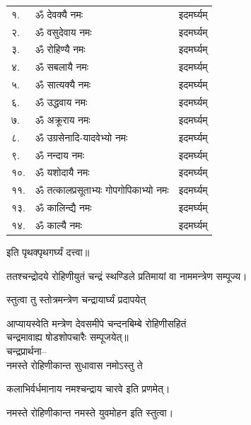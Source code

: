 \begin{center}
\begin{longtable}{ll@{—}l}
१.& ॐ देवक्यै नमः & इदमर्घ्यम्\\
२.& ॐ वसुदेवाय नमः & इदमर्घ्यम्\\
३.& ॐ रोहिण्यै नमः & इदमर्घ्यम्	\\
४.& ॐ सबलायै नमः & इदमर्घ्यम्	\\
५.& ॐ सात्यक्यै नमः & इदमर्घ्यम्\\
६.& ॐ उद्धवाय नमः & इदमर्घ्यम्	\\
७.& ॐ अक्रूराय नमः & इदमर्घ्यम्\\
८.& ॐ उग्रसेनादि-यादवेभ्यो नमः & इदमर्घ्यम्\\
९.& ॐ नन्दाय नमः & इदमर्घ्यम्\\
१०.& ॐ यशोदायै नमः & इदमर्घ्यम्	\\
११.& ॐ तत्कालप्रसूताभ्यः गोपगोपिकाभ्यो नमः & इदमर्घ्यम्\\
१३.& ॐ कालिन्द्यै नमः & इदमर्घ्यम्\\
१४.& ॐ काल्यै नमः & इदमर्घ्यम्\\

\end{longtable}

इति पृथक्पृथगर्घ्यं दत्त्वा॥\\
\medskip

ततश्चन्द्रोदये रोहिणीयुतं चन्द्रं स्थण्डिले प्रतिमायां वा नाममन्त्रेण सम्पूज्य।

{स्तुत्वा तु स्तोत्रमन्त्रेण चन्द्रायार्घ्यं प्रदापयेत्}
\medskip

आप्यायस्वेति मन्त्रेण देवसमीपे चन्दनबिम्बे रोहिणीसहितं\\
चन्द्रमावाह्य षोडशोपचारैः सम्पूजयेत्॥\\
चन्द्रप्रार्थना–\\



{नमस्ते रोहिणीकान्त सुधावास नमोऽस्तु ते}

{कलाभिर्वर्धमानाय नमश्चन्द्राय चारवे}
इति प्रणमेत्।

{नमस्ते रोहिणीकान्त नमस्ते युवमोहन}
इति स्तुत्वा।
\medskip


\end{center}
